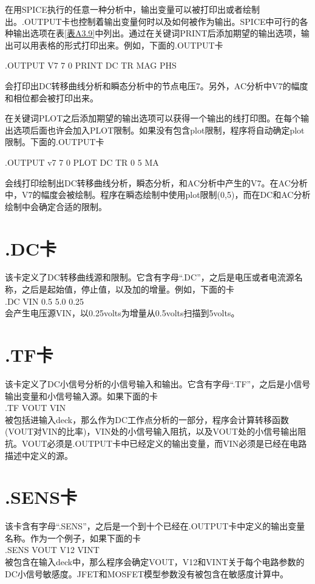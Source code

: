 在用SPICE执行的任意一种分析中，输出变量可以被打印出或者绘制出。.OUTPUT卡也控制着输出变量何时以及如何被作为输出。SPICE中可行的各种输出选项在表\ref{表A3.9}中列出。通过在关键词PRINT后添加期望的输出选项，输出可以用表格的形式打印出来。例如，下面的.OUTPUT卡

.OUTPUT V7 7 0 PRINT DC TR MAG PHS

会打印出DC转移曲线分析和瞬态分析中的节点电压7。另外，AC分析中V7的幅度和相位都会被打印出来。

在关键词PLOT之后添加期望的输出选项可以获得一个输出的线打印图。在每个输出选项后面也许会加入PLOT限制。如果没有包含plot限制，程序将自动确定plot限制。下面的.OUTPUT卡

.OUTPUT v7 7 0 PLOT DC TR 0 5 MA

会线打印绘制出DC转移曲线分析，瞬态分析，和AC分析中产生的V7。在AC分析中，V7的幅度会被绘制。程序在瞬态绘制中使用plot限制(0,5)，而在DC和AC分析绘制中会确定合适的限制。

\section{.DC卡}
该卡定义了DC转移曲线源和限制。它含有字母“.DC”，之后是电压或者电流源名称，之后是起始值，停止值，以及加的增量。例如，下面的卡\\
.DC VIN 0.5 5.0 0.25\\
会产生电压源VIN，以0.25volts为增量从0.5volts扫描到5volts。

\section{.TF卡}
该卡定义了DC小信号分析的小信号输入和输出。它含有字母“.TF”，之后是小信号输出变量和小信号输入源。如果下面的卡\\
.TF VOUT VIN\\
被包括进输入deck，那么作为DC工作点分析的一部分，程序会计算转移函数(VOUT对VIN的比率)，VIN处的小信号输入阻抗，以及VOUT处的小信号输出阻抗。VOUT必须是.OUTPUT卡中已经定义的输出变量，而VIN必须是已经在电路描述中定义的源。

\section{.SENS卡}
该卡含有字母“.SENS”，之后是一个到十个已经在.OUTPUT卡中定义的输出变量名称。作为一个例子，如果下面的卡\\
.SENS VOUT V12 VINT\\
被包含在输入deck中，那么程序会确定VOUT，V12和VINT关于每个电路参数的DC小信号敏感度。JFET和MOSFET模型参数没有被包含在敏感度计算中。

